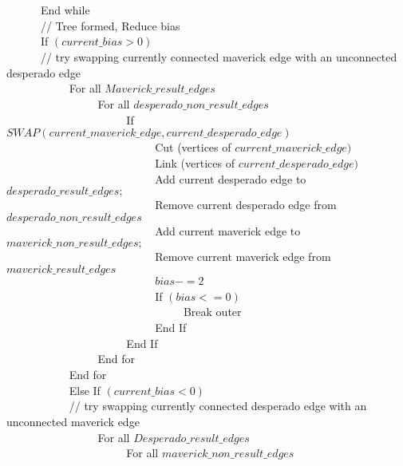 \documentclass[12pt]{article}
\begin{document}
\begin{enumerate}
\verb|		|End while\\
\verb|		|// Tree formed, Reduce bias\\
\verb|		|If $(current\_bias > 0)$\\
\verb|		|// try swapping currently connected maverick edge with an unconnected desperado edge\\
\verb|		|\verb|		|For all $Maverick\_result\_edges$\\
\verb|		|\verb|		|\verb|		|For all $desperado\_non\_result\_edges$\\
\verb|		|\verb|		|\verb|		|\verb|		|If $SWAP(current\_maverick\_edge, current\_desperado\_edge)$\\
\verb|		|\verb|		|\verb|		|\verb|		|\verb|		|Cut (vertices of $current\_maverick\_edge)$\\
\verb|		|\verb|		|\verb|		|\verb|		|\verb|		|Link (vertices of $current\_desperado\_edge)$\\
\verb|		|\verb|		|\verb|		|\verb|		|\verb|		|Add current desperado edge to $desperado\_result\_edges;$\\
\verb|		|\verb|		|\verb|		|\verb|		|\verb|		|Remove current desperado edge from $desperado\_non\_result\_edges$\\
\verb|		|\verb|		|\verb|		|\verb|		|\verb|		|Add current maverick edge to $maverick\_non\_result\_edges;$\\
\verb|		|\verb|		|\verb|		|\verb|		|\verb|		|Remove current maverick edge from $maverick\_result\_edges$\\
\verb|		|\verb|		|\verb|		|\verb|		|\verb|		|$bias -=2$\\
\verb|		|\verb|		|\verb|		|\verb|		|\verb|		|If $(bias <=0)$\\
\verb|		|\verb|		|\verb|		|\verb|		|\verb|		|\verb|		|Break outer\\
\verb|		|\verb|		|\verb|		|\verb|		|\verb|		|End If\\
\verb|		|\verb|		|\verb|		|\verb|		|End If\\
\verb|		|\verb|		|\verb|		|End for\\
\verb|		|\verb|		|End for\\
\verb|		|\verb|		|Else If $(current\_bias < 0)$\\
\verb|		|\verb|		|// try swapping currently connected desperado edge with an unconnected maverick edge\\
\verb|		|\verb|		|\verb|		|For all $Desperado\_result\_edges$\\ 
\verb|		|\verb|		|\verb|		|\verb|		|For all $maverick\_non\_result\_edges$\\

\end{enumerate}
\end{document}
